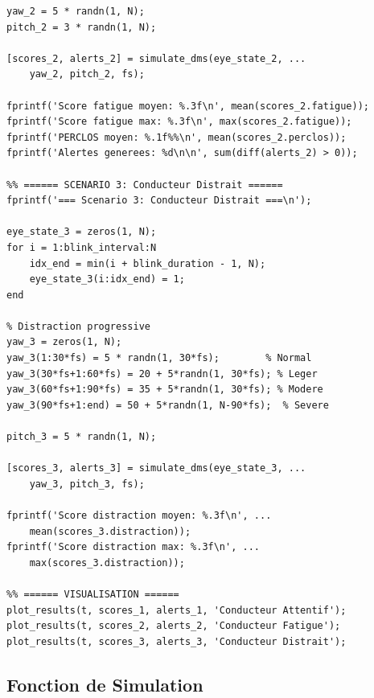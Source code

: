 \documentclass[12pt,a4paper,twoside]{report}
\begin{document}
\begin{lstlisting}[style=matlabstyle, caption={Script principal de simulation DMS en MATLAB.}, label={lst:simulation_matlab}]
yaw_2 = 5 * randn(1, N);
pitch_2 = 3 * randn(1, N);

[scores_2, alerts_2] = simulate_dms(eye_state_2, ...
    yaw_2, pitch_2, fs);

fprintf('Score fatigue moyen: %.3f\n', mean(scores_2.fatigue));
fprintf('Score fatigue max: %.3f\n', max(scores_2.fatigue));
fprintf('PERCLOS moyen: %.1f%%\n', mean(scores_2.perclos));
fprintf('Alertes generees: %d\n\n', sum(diff(alerts_2) > 0));

%% ====== SCENARIO 3: Conducteur Distrait ======
fprintf('=== Scenario 3: Conducteur Distrait ===\n');

eye_state_3 = zeros(1, N);
for i = 1:blink_interval:N
    idx_end = min(i + blink_duration - 1, N);
    eye_state_3(i:idx_end) = 1;
end

% Distraction progressive
yaw_3 = zeros(1, N);
yaw_3(1:30*fs) = 5 * randn(1, 30*fs);        % Normal
yaw_3(30*fs+1:60*fs) = 20 + 5*randn(1, 30*fs); % Leger
yaw_3(60*fs+1:90*fs) = 35 + 5*randn(1, 30*fs); % Modere
yaw_3(90*fs+1:end) = 50 + 5*randn(1, N-90*fs);  % Severe

pitch_3 = 5 * randn(1, N);

[scores_3, alerts_3] = simulate_dms(eye_state_3, ...
    yaw_3, pitch_3, fs);

fprintf('Score distraction moyen: %.3f\n', ...
    mean(scores_3.distraction));
fprintf('Score distraction max: %.3f\n', ...
    max(scores_3.distraction));

%% ====== VISUALISATION ======
plot_results(t, scores_1, alerts_1, 'Conducteur Attentif');
plot_results(t, scores_2, alerts_2, 'Conducteur Fatigue');
plot_results(t, scores_3, alerts_3, 'Conducteur Distrait');
\end{lstlisting}

\subsection{Fonction de Simulation}
\end{document}
